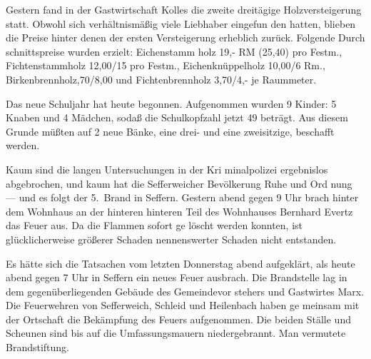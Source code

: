 

%
Gestern fand in der Gastwirtschaft Kolles\unsicher\ob
die zweite dreitägige Holzversteigerung statt.\ob
Obwohl sich verhältnismäßig viele Liebhaber eingefun\ohb
den hatten, blieben die Preise hinter denen der\ob
ersten Versteigerung erheblich zurück. Folgende Durch\ohb
schnittspreise wurden erzielt: Eichenstamm\ohb
holz 19,- RM (25,40) pro Festm., Fichtenstammholz 12,00/15\ob
pro Festm., Eichenknüppelholz 10,00/6\unsicher{} Rm., Birkenbrennholz,70/8,00 und Fichtenbrennholz 3,70/4,- je Raummeter.

%
Das neue Schuljahr hat heute begonnen.\ob
Aufgenommen wurden 9 Kinder: 5 Knaben\ob
und 4 Mädchen, sodaß die Schulkopfzahl jetzt 49 beträgt.\ob
Aus diesem Grunde müßten auf 2 neue Bänke,\ob
eine drei- und eine zweisitzige, beschafft werden.

%
Kaum sind die langen Untersuchungen in der Kri\ohb
minalpolizei ergebnislos abgebrochen, und kaum\ob
hat die Sefferweicher\unsicher{} Bevölkerung Ruhe und Ord\ohb
nung — und es folgt der 5.\ Brand in Seffern. Gestern\ob
abend gegen 9 Uhr brach hinter dem Wohnhaus an\ob
der hinteren hinteren Teil des Wohnhauses Bernhard\ob
Evertz das Feuer aus. Da die Flammen sofort ge\ohb
löscht werden konnten, ist glücklicherweise größerer\ob
Schaden\unsicher{} nennenswerter Schaden nicht entstanden.

%
Es hätte sich die Tatsachen vom letzten Donnerstag abend\ob
aufgeklärt, als heute abend gegen 7 Uhr in Seffern\ob
ein neues Feuer ausbrach. Die Brandstelle lag in\ob
dem gegenüberliegenden Gebäude des Gemeindevor\ohb
stehers und Gastwirtes Marx. Die Feuerwehren\ob
von Sefferweich, Schleid und Heilenbach haben ge\ohb
meinsam mit der Ortschaft die Bekämpfung des\ob
Feuers aufgenommen. Die beiden Ställe und\ob
Scheunen sind bis auf die Umfassungsmauern\ob
niedergebrannt. Man vermutete Brandstiftung.
\pend
